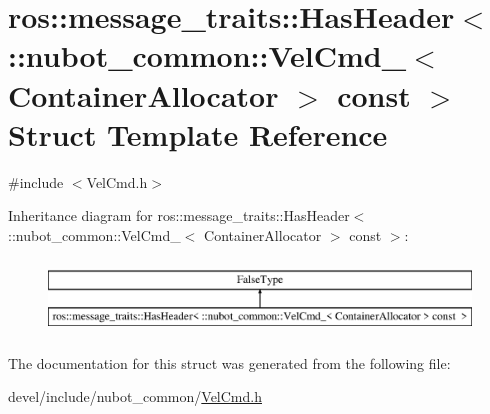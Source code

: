 \hypertarget{structros_1_1message__traits_1_1HasHeader_3_01_1_1nubot__common_1_1VelCmd___3_01ContainerAllocator_01_4_01const_01_01_4}{\section{ros\-:\-:message\-\_\-traits\-:\-:Has\-Header$<$ \-:\-:nubot\-\_\-common\-:\-:Vel\-Cmd\-\_\-$<$ Container\-Allocator $>$ const $>$ Struct Template Reference}
\label{structros_1_1message__traits_1_1HasHeader_3_01_1_1nubot__common_1_1VelCmd___3_01ContainerAllocator_01_4_01const_01_01_4}
}


{\ttfamily \#include $<$Vel\-Cmd.\-h$>$}

Inheritance diagram for ros\-:\-:message\-\_\-traits\-:\-:Has\-Header$<$ \-:\-:nubot\-\_\-common\-:\-:Vel\-Cmd\-\_\-$<$ Container\-Allocator $>$ const $>$\-:\begin{figure}[H]
\begin{center}
\leavevmode
\includegraphics[height=2.000000cm]{structros_1_1message__traits_1_1HasHeader_3_01_1_1nubot__common_1_1VelCmd___3_01ContainerAllocator_01_4_01const_01_01_4}
\end{center}
\end{figure}


The documentation for this struct was generated from the following file\-:\begin{DoxyCompactItemize}
\item 
devel/include/nubot\-\_\-common/\hyperlink{VelCmd_8h}{Vel\-Cmd.\-h}\end{DoxyCompactItemize}
